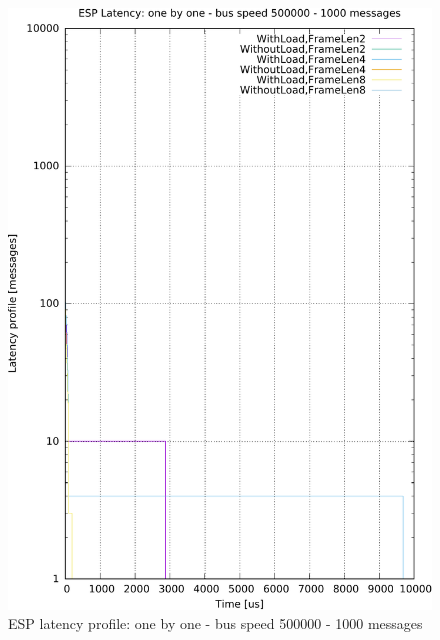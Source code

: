 \documentclass{ctuthesis}
\begin{document}
\begin{figure}[htb]
\includegraphics[width=\linewidth]{figures/speed500000_messages1000_floodFalse.pdf}
\caption{ESP latency profile: one by one - bus speed 500000 - 1000 messages}
\end{figure}
\end{document}
